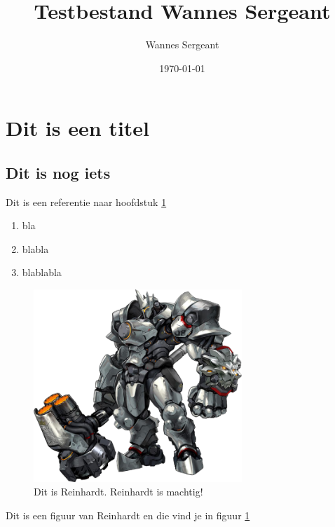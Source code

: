 \documentclass[12pt,a4paper]{article}
\author{Wannes Sergeant}
\title{Testbestand Wannes Sergeant}
\date{\today}
\begin{document}
    \maketitle
    
\section{Dit is een titel}
\label{sec:intro}

\subsection{Dit is nog iets}
    
    Dit is een referentie naar hoofdstuk \ref{sec:intro}
    
    \begin{enumerate}
        \item bla
        \item blabla
        \item blablabla
    \end{enumerate}

    \begin{figure}
        \includegraphics[width=0.7\textwidth]{img/reinhardt.jpg}
        \caption{Dit is Reinhardt. Reinhardt is machtig!}
        \label{fig:reinhardt}
    \end{figure}

    Dit is een figuur van Reinhardt en die vind je in figuur \ref{fig:reinhardt}
    
\end{document}
